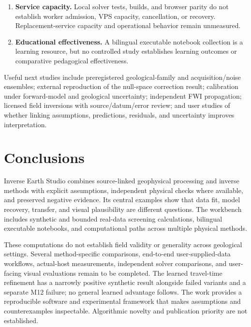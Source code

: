 \begin{enumerate}
  retained external inputs, including joint-inversion matrices and
  magnetic controls. Missing inputs are not replaced with synthetic
  stand-ins. Rights-limited source files are not copied merely to make a
  computation executable.
\item
  \textbf{Service capacity.} Local solver tests, builds, and browser
  parity do not establish worker admission, VPS capacity, cancellation,
  or recovery. Replacement-service capacity and operational behavior
  remain unmeasured.
\item
  \textbf{Educational effectiveness.} A bilingual executable notebook
  collection is a learning resource, but no controlled study establishes
  learning outcomes or comparative pedagogical effectiveness.
\end{enumerate}

Useful next studies include preregistered geological-family and
acquisition/noise ensembles; external reproduction of the null-space
correction result; calibration under forward-model and geological
uncertainty; independent FWI propagation; licensed field inversions with
source/datum/error review; and user studies of whether linking
assumptions, predictions, residuals, and uncertainty improves
interpretation.

\section{Conclusions}\label{conclusions}

Inverse Earth Studio combines source-linked geophysical processing and
inverse methods with explicit assumptions, independent physical checks
where available, and preserved negative evidence. Its central examples
show that data fit, model recovery, transfer, and visual plausibility
are different questions. The workbench includes synthetic and bounded
real-data screening calculations, bilingual executable notebooks, and
computational paths across multiple physical methods.

These computations do not establish field validity or generality across
geological settings. Several method-specific comparisons, end-to-end
user-supplied-data workflows, actual-host measurements, independent
solver comparisons, and user-facing visual evaluations remain to be
completed. The learned travel-time refinement has a narrowly positive
synthetic result alongside failed variants and a separate M12 failure;
no general learned advantage follows. The work provides a reproducible
software and experimental framework that makes assumptions and
counterexamples inspectable. Algorithmic novelty and publication
priority are not established.

